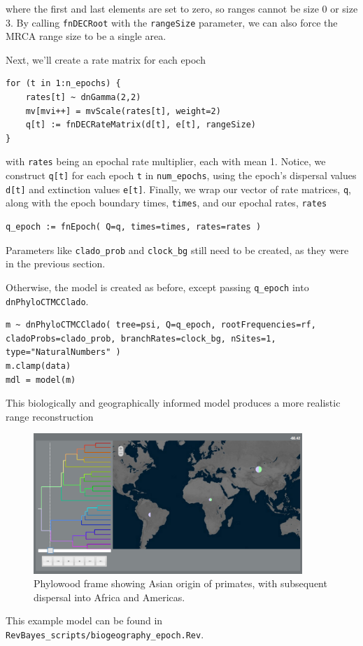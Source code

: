 where the first and last elements are set to zero, so ranges cannot be size 0 or size 3.
By calling {\tt fnDECRoot} with the {\tt rangeSize} parameter, we can also force the MRCA range size to be a single area.

Next, we'll create a rate matrix for each epoch

\begin{snugshade}
\begin{lstlisting}
for (t in 1:n_epochs) {
	rates[t] ~ dnGamma(2,2)
	mv[mvi++] = mvScale(rates[t], weight=2)	
	q[t] := fnDECRateMatrix(d[t], e[t], rangeSize)
}
\end{lstlisting}
\end{snugshade}

with {\tt rates} being an epochal rate multiplier, each with mean 1.
Notice, we construct {\tt q[t]} for each epoch {\tt t} in {\tt num\_epochs}, using the epoch's dispersal values {\tt d[t]} and extinction values {\tt e[t]}.
Finally, we wrap our vector of rate matrices, {\tt q}, along with the epoch boundary times, {\tt times}, and  our epochal rates, {\tt rates} 

\begin{snugshade}
\begin{lstlisting}
q_epoch := fnEpoch( Q=q, times=times, rates=rates )
\end{lstlisting}
\end{snugshade}

Parameters like {\tt clado\_prob} and {\tt clock\_bg} still need to be created, as they were in the previous section.

Otherwise, the model is created as before, except passing {\tt q\_epoch} into {\tt dnPhyloCTMCClado}.

\begin{snugshade}
\begin{lstlisting}
m ~ dnPhyloCTMCClado( tree=psi, Q=q_epoch, rootFrequencies=rf, cladoProbs=clado_prob, branchRates=clock_bg, nSites=1, type="NaturalNumbers" )
m.clamp(data)
mdl = model(m)
\end{lstlisting}
\end{snugshade}

This biologically and geographically informed model produces a more realistic range reconstruction

\begin{figure}[H]
\centering
\includegraphics[width=4in]{figures/bg_2_epoch}
\caption{Phylowood frame showing Asian origin of primates, with subsequent dispersal into Africa and Americas.}
\end{figure}


This example model can be found in {\tt RevBayes\_scripts/biogeography\_epoch.Rev}.

